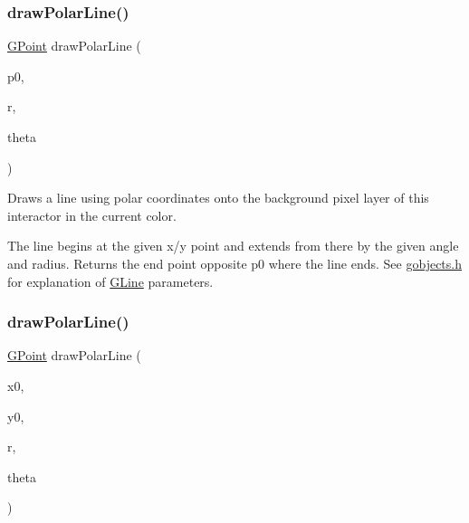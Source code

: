 \mbox{\label{classGDrawingSurface_af70cce1e4f708f1ed5b6f29cecb660e7}} 
\subsubsection{\texorpdfstring{draw\+Polar\+Line()}{drawPolarLine()}\hspace{0.1cm}{\footnotesize\ttfamily [1/2]}}
{\footnotesize\ttfamily \mbox{\hyperlink{classGPoint}{G\+Point}} draw\+Polar\+Line (\begin{DoxyParamCaption}\item[{const \mbox{\hyperlink{classGPoint}{G\+Point}} \&}]{p0,  }\item[{double}]{r,  }\item[{double}]{theta }\end{DoxyParamCaption})\hspace{0.3cm}{\ttfamily [virtual]}}



Draws a line using polar coordinates onto the background pixel layer of this interactor in the current color. 

The line begins at the given x/y point and extends from there by the given angle and radius. Returns the end point opposite p0 where the line ends. See \mbox{\hyperlink{gobjects_8h_source}{gobjects.\+h}} for explanation of \mbox{\hyperlink{classGLine}{G\+Line}} parameters. \mbox{\label{classGDrawingSurface_ad3e646f90005295f2bbdf37d2bcb39d2}} 
\subsubsection{\texorpdfstring{draw\+Polar\+Line()}{drawPolarLine()}\hspace{0.1cm}{\footnotesize\ttfamily [2/2]}}
{\footnotesize\ttfamily \mbox{\hyperlink{classGPoint}{G\+Point}} draw\+Polar\+Line (\begin{DoxyParamCaption}\item[{double}]{x0,  }\item[{double}]{y0,  }\item[{double}]{r,  }\item[{double}]{theta }\end{DoxyParamCaption})\hspace{0.3cm}{\ttfamily [virtual]}}



